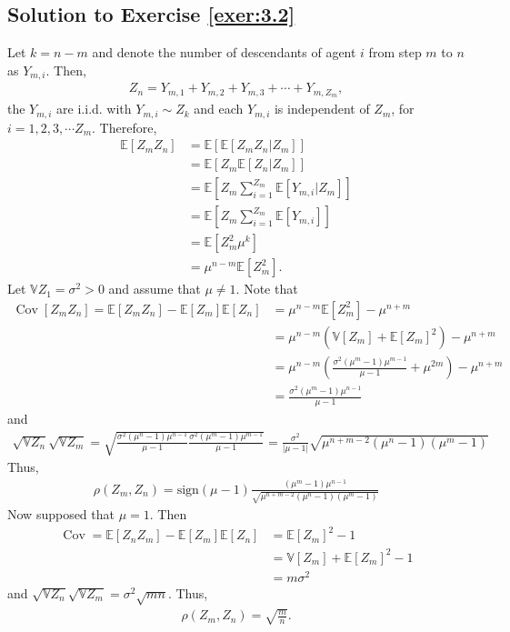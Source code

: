 \documentclass[12pt]{book}
\numberwithin{equation}{chapter}
\theoremstyle{plain}
\numberwithin{theorem}{section}
\theoremstyle{definition}
\numberwithin{exercise}{chapter}
\newcommand{\<}{\langle}
\renewcommand{\>}{\rangle}
\renewcommand{\(}{\left(}
\renewcommand{\)}{\right)}
\renewcommand{\[}{\left[}
\renewcommand{\]}{\right]}
\newcommand\Eb{\mathds{E}}
\newcommand\Vb{\mathds{V}}
\newcommand\sig{\sigma}
\begin{document}
\subsection*{Solution to Exercise \ref{exer:3.2}}
Let $k = n - m$ and denote the number of descendants of agent $i$ from step $m$ to $n$ as $Y_{m,i}$. Then,
\begin{align}
Z_n
	= Y_{m,1} + Y_{m,2} + Y_{m,3} + \cdots + Y_{m,Z_m},
\end{align}
the $Y_{m,i}$ are i.i.d. with $Y_{m,i} \sim Z_k$ and each $Y_{m,i}$ is independent of $Z_m$, for $i = 1,2,3,\cdots Z_m$. Therefore, 
\begin{align}
\Eb[ Z_m Z_n]
	&= \Eb[ \Eb[ Z_m Z_n | Z_m] ] \\
	&= \Eb[ Z_m \Eb[ Z_n | Z_m] ] \\
	&= \Eb\[ Z_m \sum_{i=1}^{Z_m} \Eb[ Y_{m,i} | Z_m ] \] \\
	&= \Eb\[ Z_m \sum_{i=1}^{Z_m} \Eb[ Y_{m,i} ] \] \\
	&= \Eb[ Z_m^2 \mu^{k} ] \\
	&= \mu^{n-m} \Eb[ Z_m^2].
\end{align}
Let $\Vb Z_1 = \sigma^2 > 0$ and assume that $\mu \neq 1$. Note that
\begin{align}
\operatorname{Cov}[ Z_m Z_n]
	= \Eb[ Z_m Z_n] - \Eb[Z_m] \Eb[ Z_n]
	&= \mu^{n-m} \Eb[ Z_m^2] - \mu^{n+m}\\
	&= \mu^{n-m} ( \Vb[ Z_m] + \Eb[ Z_m]^2) - \mu^{n+m} \\
	&= \mu^{n-m} \(\frac{ \sig^2 (\mu^m - 1) \mu^{m-1}}{\mu-1} + \mu^{2m}\) - \mu^{n+m} \\
	&= \frac{\sigma ^2 \left(\mu ^m-1\right) \mu ^{n-1}}{\mu -1}
\end{align}
and
\begin{align}
\sqrt{\Vb Z_n} \sqrt{\Vb Z_m}
	= \sqrt{\frac{ \sig^2 (\mu^n - 1) \mu^{n-1}}{\mu-1}
		\frac{ \sig^2 (\mu^m - 1) \mu^{m-1}}{\mu-1}
	}
	= \frac{\sig^2}{|\mu -1|} 
	\sqrt{ \mu^{n+m-2} (\mu^n - 1)(\mu^m - 1)}
\end{align}
Thus,
\begin{align}
\rho(Z_m,Z_n)
	= \text{sign}(\mu - 1) \frac{\left(\mu ^m-1\right) \mu ^{n-1}}{\sqrt{ \mu^{n+m-2} (\mu^n - 1)(\mu^m - 1)}}
\end{align}
Now supposed that $\mu = 1$. Then 
\begin{align}
\operatorname{Cov}
	= \Eb[Z_n Z_m] - \Eb[Z_m]\Eb[Z_n]
	&= \Eb[Z_m]^2 - 1 \\
	&= \Vb[ Z_m] + \Eb[Z_m]^2 - 1 \\
	&= m\sig^2
\end{align}
and $\sqrt{\Vb Z_n} \sqrt{\Vb Z_m} = \sig^2 \sqrt{ mn}$. Thus,
\begin{align}
\rho(Z_m,Z_n)
	= \sqrt{ \frac{m}{n}}.
\end{align}
\end{document}
